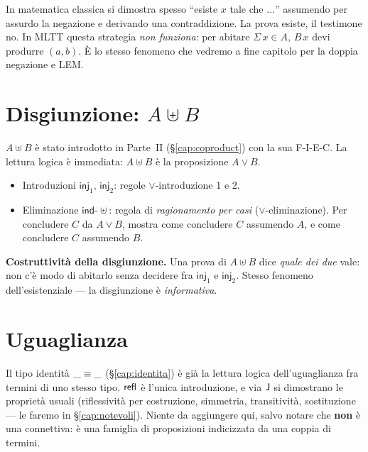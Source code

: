 \begin{oss}
In matematica classica si dimostra spesso ``esiste $x$ tale che $\ldots$'' assumendo per assurdo la negazione e derivando una contraddizione. La prova esiste, il testimone no. In MLTT questa strategia \emph{non funziona}: per abitare $\Sigma\,x \in A,\,B\,x$ devi produrre $(a, b)$. \`E lo stesso fenomeno che vedremo a fine capitolo per la doppia negazione e LEM.
\end{oss}

\section*{Disgiunzione: $A \uplus B$}\label{sec:coproduct}

$A \uplus B$ \`e stato introdotto in Parte~II (\S\ref{cap:coproduct}) con la sua F-I-E-C. La lettura logica \`e immediata: $A \uplus B$ \`e la proposizione $A \vee B$.

\begin{itemize}
\item Introduzioni $\mathsf{inj}_1$, $\mathsf{inj}_2$: regole $\vee$-introduzione 1 e 2.
\item Eliminazione $\mathsf{ind}\text{-}\uplus$: regola di \emph{ragionamento per casi} ($\vee$-eliminazione). Per concludere $C$ da $A \vee B$, mostra come concludere $C$ assumendo $A$, e come concludere $C$ assumendo $B$.
\end{itemize}

\textbf{Costruttivit\`a della disgiunzione.} Una prova di $A \uplus B$ dice \emph{quale dei due} vale: non c'\`e modo di abitarlo senza decidere fra $\mathsf{inj}_1$ e $\mathsf{inj}_2$. Stesso fenomeno dell'esistenziale --- la disgiunzione \`e \emph{informativa}.

\section*{Uguaglianza}

Il tipo identit\`a $\_\equiv\_$ (\S\ref{cap:identita}) \`e gi\`a la lettura logica dell'uguaglianza fra termini di uno stesso tipo. $\mathsf{refl}$ \`e l'unica introduzione, e via $\mathsf{J}$ si dimostrano le propriet\`a usuali (riflessivit\`a per costruzione, simmetria, transitivit\`a, sostituzione --- le faremo in \S\ref{cap:notevoli}). Niente da aggiungere qui, salvo notare che \textbf{non} \`e una connettiva: \`e una famiglia di proposizioni indicizzata da una coppia di termini.


